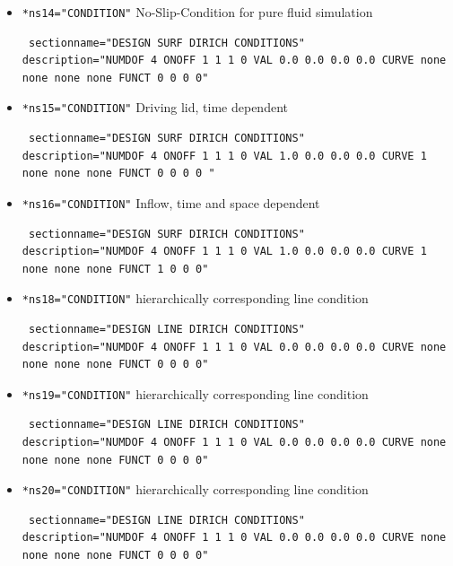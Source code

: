 \begin{itemize}
 \item \verb|*ns14="CONDITION"| \qquad No-Slip-Condition for pure fluid simulation
\begin{small} \begin{verbatim} sectionname="DESIGN SURF DIRICH CONDITIONS"
description="NUMDOF 4 ONOFF 1 1 1 0 VAL 0.0 0.0 0.0 0.0 CURVE none none none none FUNCT 0 0 0 0"
\end{verbatim} \end{small}

 \item \verb|*ns15="CONDITION"| \qquad Driving lid, time dependent
\begin{small} \begin{verbatim} sectionname="DESIGN SURF DIRICH CONDITIONS"
description="NUMDOF 4 ONOFF 1 1 1 0 VAL 1.0 0.0 0.0 0.0 CURVE 1 none none none FUNCT 0 0 0 0 "
\end{verbatim} \end{small}

 \item \verb|*ns16="CONDITION"| \qquad Inflow, time and space dependent
\begin{small} \begin{verbatim} sectionname="DESIGN SURF DIRICH CONDITIONS"
description="NUMDOF 4 ONOFF 1 1 1 0 VAL 1.0 0.0 0.0 0.0 CURVE 1 none none none FUNCT 1 0 0 0"
\end{verbatim} \end{small}

 \item \verb|*ns18="CONDITION"| \qquad hierarchically corresponding line condition
\begin{small} \begin{verbatim} sectionname="DESIGN LINE DIRICH CONDITIONS"
description="NUMDOF 4 ONOFF 1 1 1 0 VAL 0.0 0.0 0.0 0.0 CURVE none none none none FUNCT 0 0 0 0"
\end{verbatim} \end{small}

 \item \verb|*ns19="CONDITION"| \qquad hierarchically corresponding line condition
\begin{small} \begin{verbatim} sectionname="DESIGN LINE DIRICH CONDITIONS"
description="NUMDOF 4 ONOFF 1 1 1 0 VAL 0.0 0.0 0.0 0.0 CURVE none none none none FUNCT 0 0 0 0"
\end{verbatim} \end{small}

 \item \verb|*ns20="CONDITION"| \qquad hierarchically corresponding line condition
\begin{small} \begin{verbatim} sectionname="DESIGN LINE DIRICH CONDITIONS"
description="NUMDOF 4 ONOFF 1 1 1 0 VAL 0.0 0.0 0.0 0.0 CURVE none none none none FUNCT 0 0 0 0"
\end{verbatim} \end{small}


\end{itemize}
